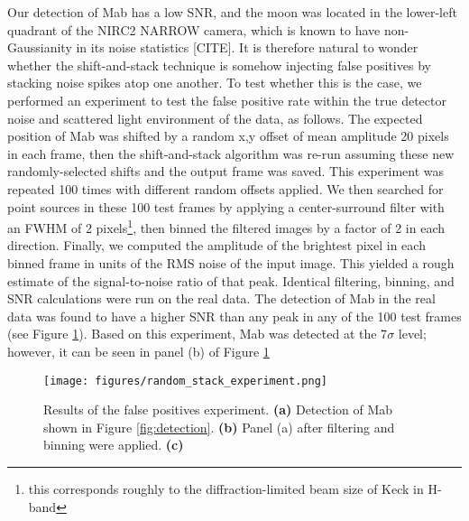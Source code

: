 \documentclass[preprint]{aastex631}
\begin{document}
Our detection of Mab has a low SNR, and the moon was located in the lower-left quadrant of the NIRC2 NARROW camera, which is known to have non-Gaussianity in its noise statistics [CITE]. It is therefore natural to wonder whether the shift-and-stack technique is somehow injecting false positives by stacking noise spikes atop one another. To test whether this is the case, we performed an experiment to test the false positive rate within the true detector noise and scattered light environment of the data, as follows. The expected position of Mab was shifted by a random x,y offset of mean amplitude 20 pixels in each frame, then the shift-and-stack algorithm was re-run assuming these new randomly-selected shifts and the output frame was saved. This experiment was repeated 100 times with different random offsets applied. We then searched for point sources in these 100 test frames by applying a center-surround filter with an FWHM of 2 pixels\footnote{this corresponds roughly to the diffraction-limited beam size of Keck in H-band}, then binned the filtered images by a factor of 2 in each direction. Finally, we computed the amplitude of the brightest pixel in each binned frame in units of the RMS noise of the input image. This yielded a rough estimate of the signal-to-noise ratio of that peak. Identical filtering, binning, and SNR calculations were run on the real data. The detection of Mab in the real data was found to have a higher SNR than any peak in any of the 100 test frames (see Figure \ref{fig:randomstack}). Based on this experiment, Mab was detected at the 7$\sigma$ level; however, it can be seen in panel (b) of Figure \ref{fig:randomstack}

\begin{figure}
\texttt{[image: figures/random\_stack\_experiment.png]}
\caption{Results of the false positives experiment. \textbf{(a)} Detection of Mab shown in Figure \ref{fig:detection}. \textbf{(b)} Panel (a) after filtering and binning were applied. \textbf{(c)} \label{fig:randomstack}}
\end{figure}




\end{document}

